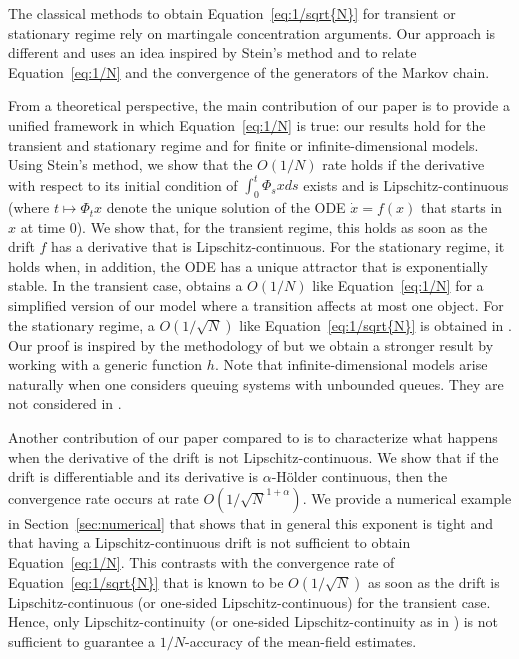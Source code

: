 \documentclass[sigconf]{acmart}
\begin{document}
The classical methods to obtain Equation~\eqref{eq:1/sqrt{N}} for
transient \cite{benaim2008class,kurtz70} or stationary regime
\cite{bortolussi2013bounds} rely on martingale concentration
arguments.  Our approach is different and uses an idea inspired by
Stein's method and
\cite{kolokoltsov2011mean,stein1986approximate,ying2016rate} to relate
Equation~\eqref{eq:1/N} and the convergence of the generators of the
Markov chain.  

From a theoretical perspective, the main contribution of our paper is
to provide a unified framework in which Equation~\eqref{eq:1/N} is
true: our results hold for the transient and stationary regime and for
finite or infinite-dimensional models.  Using Stein's method, we show
that the $O(1/N)$ rate holds if the derivative with respect to its
initial condition of $\int_0^t\Phi_sxds$ exists and is
Lipschitz-continuous (where $t\mapsto\Phi_tx$ denote the unique
solution of the ODE $\dot{x}=f(x)$ that starts in $x$ at time $0$).
We show that, for the transient regime, this holds as soon as the
drift $f$ has a derivative that is Lipschitz-continuous. For the
stationary regime, it holds when, in addition, the ODE has a unique
attractor that is exponentially stable.  In the transient case,
\cite{kolokoltsov2011mean} obtains a $O(1/N)$ like
Equation~\eqref{eq:1/N} for a simplified version of our model where a
transition affects at most one object.  For the stationary regime, a
$O(1/\sqrt{N})$ like Equation~\eqref{eq:1/sqrt{N}} is obtained in
\cite{ying2016rate}. Our proof is inspired by the methodology of
\cite{ying2016rate} but we obtain a stronger result by working with a
generic function $h$.  Note that infinite-dimensional models arise
naturally when one considers queuing systems with unbounded
queues. They are not considered in
\cite{kolokoltsov2011mean,ying2016rate}.

Another contribution of our paper compared to
\cite{kolokoltsov2011mean,ying2016rate} is to characterize what
happens when the derivative of the drift is not
Lipschitz-continuous.  We show that if the drift is differentiable and
its derivative is $\alpha$-Hölder continuous, then the convergence
rate occurs at rate $O(1/\sqrt{N}^{1+\alpha})$.  We provide a
numerical example in Section~\ref{sec:numerical} that shows that in
general this exponent is tight and that having a Lipschitz-continuous
drift is not sufficient to obtain Equation~\eqref{eq:1/N}. This
contrasts with the convergence rate of Equation~\eqref{eq:1/sqrt{N}}
that is known to be $O(1/\sqrt{N})$ as soon as the drift is
Lipschitz-continuous (or one-sided Lipschitz-continuous) for the
transient case.  Hence, only Lipschitz-continuity (or one-sided
Lipschitz-continuity as in \cite{gast2012markov,tsitsiklis2011power})
is not sufficient to guarantee a $1/N$-accuracy of the mean-field
estimates.
\end{document}
